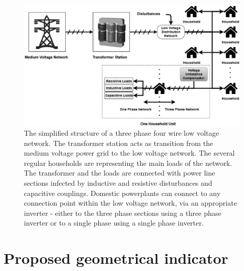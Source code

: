         \begin{figure}[!ht]
            \centering
            \includegraphics[width=\textwidth]{Unblance_EPS_Pics/network_gray.eps}
            \caption{The simplified structure of a three phase four wire low voltage network. The transformer station acts as transition from the medium voltage power grid to
            the low voltage network. The several regular households are representing the main loads of the network. The transformer and the loads are connected with power line sections infected by inductive and resistive disturbances and capacitive couplings. Domestic powerplants can connect to any connection point within the low voltage network, via an appropriate inverter - either to the three phase sections using a three phase inverter or to a single phase using a single phase inverter.}
            \label{fig:network}
            \end{figure}

\section{Proposed geometrical indicator}\label{VUB:sec:Geom}

